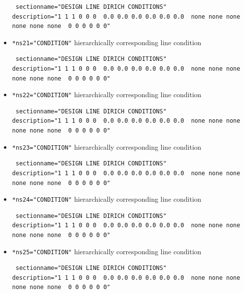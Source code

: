 \begin{itemize}
\begin{small} \begin{verbatim} sectionname="DESIGN LINE DIRICH CONDITIONS"
description="1 1 1 0 0 0  0.0 0.0 0.0 0.0 0.0 0.0  none none none none none none  0 0 0 0 0 0"
\end{verbatim} \end{small} \item \verb|*ns21="CONDITION"| \qquad hierarchically corresponding line condition
\begin{small} \begin{verbatim} sectionname="DESIGN LINE DIRICH CONDITIONS"
description="1 1 1 0 0 0  0.0 0.0 0.0 0.0 0.0 0.0  none none none none none none  0 0 0 0 0 0"
\end{verbatim} \end{small} \item \verb|*ns22="CONDITION"| \qquad hierarchically corresponding line condition
\begin{small} \begin{verbatim} sectionname="DESIGN LINE DIRICH CONDITIONS"
description="1 1 1 0 0 0  0.0 0.0 0.0 0.0 0.0 0.0  none none none none none none  0 0 0 0 0 0"
\end{verbatim} \end{small} \item \verb|*ns23="CONDITION"| \qquad hierarchically corresponding line condition
\begin{small} \begin{verbatim} sectionname="DESIGN LINE DIRICH CONDITIONS"
description="1 1 1 0 0 0  0.0 0.0 0.0 0.0 0.0 0.0  none none none none none none  0 0 0 0 0 0"
\end{verbatim} \end{small} \item \verb|*ns24="CONDITION"| \qquad hierarchically corresponding line condition
\begin{small} \begin{verbatim} sectionname="DESIGN LINE DIRICH CONDITIONS"
description="1 1 1 0 0 0  0.0 0.0 0.0 0.0 0.0 0.0  none none none none none none  0 0 0 0 0 0"
\end{verbatim} \end{small} \item \verb|*ns25="CONDITION"| \qquad hierarchically corresponding line condition
\begin{small} \begin{verbatim} sectionname="DESIGN LINE DIRICH CONDITIONS"
description="1 1 1 0 0 0  0.0 0.0 0.0 0.0 0.0 0.0  none none none none none none  0 0 0 0 0 0"

\end{verbatim}
\end{small}
\end{itemize}
